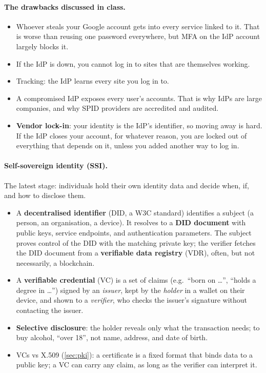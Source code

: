 \paragraph{The drawbacks discussed in class.}
\begin{itemize}
    \item Whoever steals your Google account gets into every service linked to it. That is worse than reusing one password everywhere, but MFA on the IdP account largely blocks it.
    \item If the IdP is down, you cannot log in to sites that are themselves working.
    \item Tracking: the IdP learns every site you log in to.
    \item A compromised IdP exposes every user's accounts. That is why IdPs are large companies, and why SPID providers are accredited and audited.
    \item \textbf{Vendor lock-in}: your identity is the IdP's identifier, so moving away is hard. If the IdP closes your account, for whatever reason, you are locked out of everything that depends on it, unless you added another way to log in.
\end{itemize}

\paragraph{Self-sovereign identity (SSI).} The latest stage: individuals hold their own identity data and decide when, if, and how to disclose them.
\begin{itemize}
    \item A \textbf{decentralised identifier} (DID, a W3C standard) identifies a subject (a person, an organisation, a device). It resolves to a \textbf{DID document} with public keys, service endpoints, and authentication parameters. The subject proves control of the DID with the matching private key; the verifier fetches the DID document from a \textbf{verifiable data registry} (VDR), often, but not necessarily, a blockchain.
    \item A \textbf{verifiable credential} (VC) is a set of claims (e.g.\ \enquote{born on \dots}, \enquote{holds a degree in \dots}) signed by an \emph{issuer}, kept by the \emph{holder} in a wallet on their device, and shown to a \emph{verifier}, who checks the issuer's signature without contacting the issuer.
    \item \textbf{Selective disclosure}: the holder reveals only what the transaction needs; to buy alcohol, \enquote{over 18}, not name, address, and date of birth.
    \item VCs vs X.509 (\cref{sec:pki}): a certificate is a fixed format that binds data to a public key; a VC can carry any claim, as long as the verifier can interpret it.
\end{itemize}

